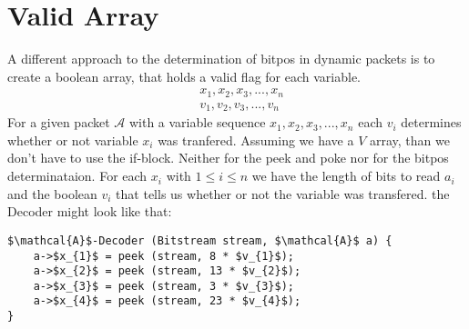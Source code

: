 \documentclass{article}
\begin{document}
	\section{Valid Array}
		A different approach to the determination of bitpos in dynamic packets is to create a boolean array, that holds a valid flag for each variable.
		\begin{align*}
			&x_{1}, x_{2}, x_{3}, ... , x_{n}\\
			&v_{1}, v_{2}, v_{3}, ... , v_{n}	
		\end{align*}
		For a given packet $\mathcal{A}$ with a variable sequence $x_{1}, x_{2}, x_{3}, ... , x_{n}$ each $v_{i}$ determines whether or not variable $x_{i}$ was tranfered.
		Assuming we have a $V$ array, than we don't have to use the if-block. Neither for the peek and poke nor for the bitpos determinataion.
		For each $x_{i}$ with $1\leq i\leq n$ we have the length of bits to read $a_{i}$ and the boolean $v_{i}$ that tells us whether or not the variable was transfered.
		the Decoder might look like that:
		\begin{lstlisting}[mathescape]
$\mathcal{A}$-Decoder (Bitstream stream, $\mathcal{A}$ a) {
	a->$x_{1}$ = peek (stream, 8 * $v_{1}$);
	a->$x_{2}$ = peek (stream, 13 * $v_{2}$);
	a->$x_{3}$ = peek (stream, 3 * $v_{3}$);
	a->$x_{4}$ = peek (stream, 23 * $v_{4}$);
}
		\end{lstlisting}
\end{document}
